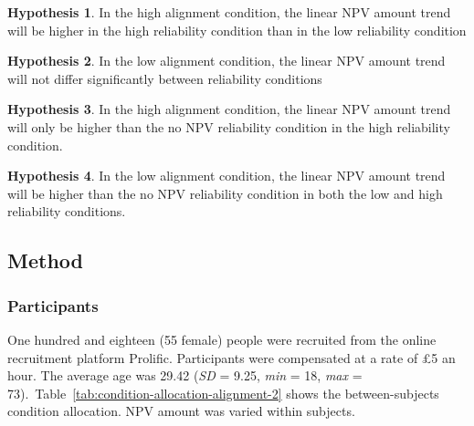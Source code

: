 \documentclass[a4paper, nobind, dvipsnames]{templates/ociamthesis}
\theoremstyle{definition}
\theoremstyle{definition}
\theoremstyle{definition}
\theoremstyle{definition}
\newtheorem{hypothesis}{Hypothesis}[chapter]
\theoremstyle{remark}
\begin{document}
\begin{hypothesis}
\protect\hypertarget{hyp:allocation-alignment-high-alignment-2}{}{\label{hyp:allocation-alignment-high-alignment-2} }In the high alignment condition, the linear NPV amount trend will be higher in
the high reliability condition than in the low reliability condition
\end{hypothesis}

\begin{hypothesis}
\protect\hypertarget{hyp:allocation-alignment-low-alignment-2}{}{\label{hyp:allocation-alignment-low-alignment-2} }In the low alignment condition, the linear NPV amount trend will not differ
significantly between reliability conditions
\end{hypothesis}

\begin{hypothesis}
\protect\hypertarget{hyp:allocation-alignment-high-no-NPV-alignment-2}{}{\label{hyp:allocation-alignment-high-no-NPV-alignment-2} }In the high alignment condition, the linear NPV amount trend will only be higher
than the no NPV reliability condition in the high reliability condition.
\end{hypothesis}

\begin{hypothesis}
\protect\hypertarget{hyp:allocation-alignment-low-no-NPV-alignment-2}{}{\label{hyp:allocation-alignment-low-no-NPV-alignment-2} }In the low alignment condition, the linear NPV amount trend will be higher than
the no NPV reliability condition in both the low and high reliability
conditions.
\end{hypothesis}

\subsection{Method}

\subsubsection{Participants}

One hundred and eighteen (55 female) people were recruited from the online recruitment platform Prolific. Participants were compensated at a rate of £5 an hour. The average age was 29.42 (\emph{SD} = 9.25, \emph{min} = 18, \emph{max} = 73).~Table~\ref{tab:condition-allocation-alignment-2}
shows the between-subjects condition allocation. NPV amount was varied within
subjects.
\end{document}
